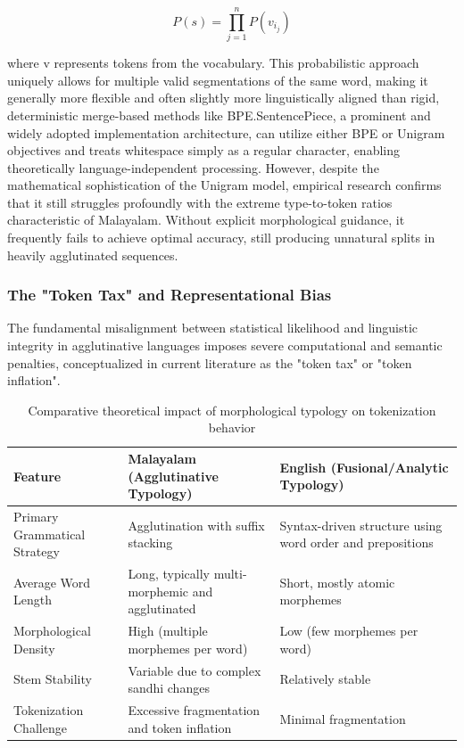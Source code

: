 \documentclass[12pt]{article}
\begin{document}
\begin{equation}
P(s) = \prod_{j=1}^{n} P(v_{i_j})
\end{equation}

where v represents tokens from the vocabulary. This probabilistic approach uniquely allows for multiple valid segmentations of the same word, making it generally more flexible and often slightly more linguistically aligned than rigid, deterministic merge-based methods like BPE.SentencePiece, a prominent and widely adopted implementation architecture, can utilize either BPE or Unigram objectives and treats whitespace simply as a regular character, enabling theoretically language-independent processing. However, despite the mathematical sophistication of the Unigram model, empirical research confirms that it still struggles profoundly with the extreme type-to-token ratios characteristic of Malayalam. Without explicit morphological guidance, it frequently fails to achieve optimal accuracy, still producing unnatural splits in heavily agglutinated sequences. 

\subsubsection{The "Token Tax" and Representational Bias}

The fundamental misalignment between statistical likelihood and linguistic integrity in agglutinative languages imposes severe computational and semantic penalties, conceptualized in current literature as the "token tax" or "token inflation". 

\begin{table}[H]
\centering
\renewcommand{\arraystretch}{1.3}
\begin{tabularx}{\textwidth}{l X X}
\toprule
\textbf{Feature} & \textbf{Malayalam (Agglutinative Typology)} & \textbf{English (Fusional/Analytic Typology)} \\
\midrule

Primary Grammatical Strategy 
& Agglutination with suffix stacking 
& Syntax-driven structure using word order and prepositions \\

Average Word Length 
& Long, typically multi-morphemic and agglutinated 
& Short, mostly atomic morphemes \\

Morphological Density 
& High (multiple morphemes per word) 
& Low (few morphemes per word) \\

Stem Stability 
& Variable due to complex sandhi changes 
& Relatively stable \\

Tokenization Challenge 
& Excessive fragmentation and token inflation 
& Minimal fragmentation \\

\bottomrule
\end{tabularx}
\caption{Comparative theoretical impact of morphological typology on tokenization behavior}
\end{table}
\end{document}
